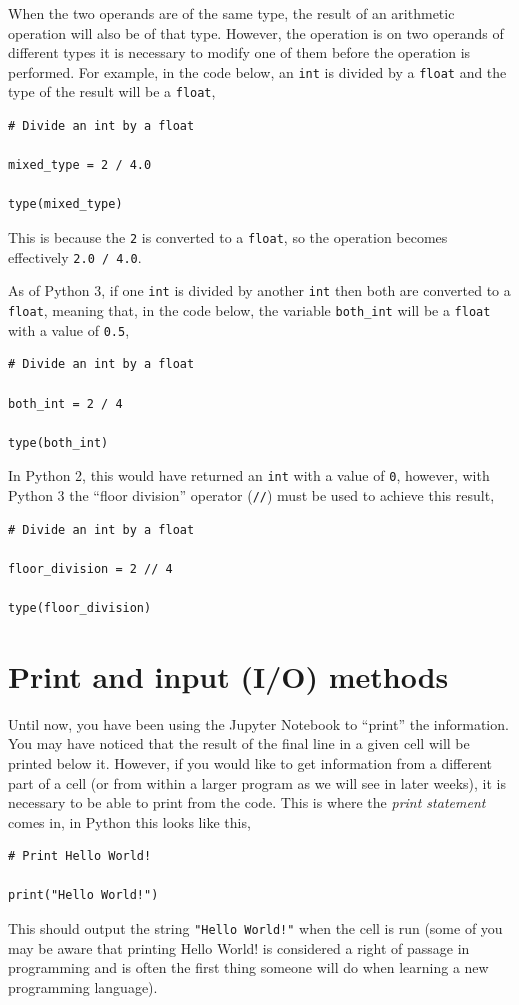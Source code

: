 \documentclass[a4paper]{article}
\begin{document}
When the two operands are of the same type, the result of an arithmetic operation will also be of that type.
However, the operation is on two operands of different types it is necessary to modify one of them before the operation is performed.
For example, in the code below, an \texttt{int} is divided by a \texttt{float} and the type of the result will be a \texttt{float},
\begin{lstlisting}
# Divide an int by a float

mixed_type = 2 / 4.0

type(mixed_type)
\end{lstlisting}
This is because the \texttt{2} is converted to a \texttt{float}, so the operation becomes effectively \texttt{2.0 / 4.0}.

As of Python 3, if one \texttt{int} is divided by another \texttt{int} then both are converted to a \texttt{float}, meaning that, in the code below, the variable \texttt{both\_int} will be a \texttt{float} with a value of \texttt{0.5},
\begin{lstlisting}
# Divide an int by a float

both_int = 2 / 4

type(both_int)
\end{lstlisting}
In Python 2, this would have returned an \texttt{int} with a value of \texttt{0}, however, with Python 3 the ``floor division'' operator (\texttt{//}) must be used to achieve this result,
\begin{lstlisting}
# Divide an int by a float

floor_division = 2 // 4

type(floor_division)
\end{lstlisting}

\section{Print and input (I/O) methods}

Until now, you have been using the Jupyter Notebook to ``print'' the information.
You may have noticed that the result of the final line in a given cell will be printed below it.
However, if you would like to get information from a different part of a cell (or from within a larger program as we will see in later weeks), it is necessary to be able to print from the code.
This is where the \emph{print statement} comes in, in Python this looks like this,
\begin{lstlisting}
# Print Hello World!

print("Hello World!")
\end{lstlisting}
This should output the string \texttt{"Hello World!"} when the cell is run (some of you may be aware that printing Hello World! is considered a right of passage in programming and is often the first thing someone will do when learning a new programming language).
\end{document}
